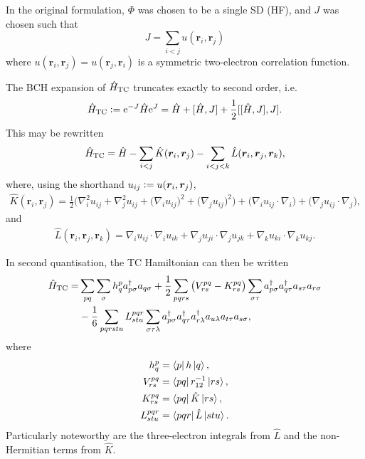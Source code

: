 In the original formulation, $\Phi$ was chosen to be a single \gls{SD} (\gls{HF}), and $J$ was chosen such that
\begin{equation}
    \label{eq:jastrow-two-elec}
    J = \sum_{i<j}u(\bm r_i, \bm r_j)
\end{equation}
where $u(\bm r_i, \bm r_j) = u(\bm r_j, \bm r_i)$ is a symmetric two-electron correlation function.

The \gls{BCH} expansion of $\hat H_\mathrm{TC}$ truncates exactly to second order, i.e.
\begin{equation}
    \hat H_\mathrm{TC} \mathrel{\mathop:}= \mathrm{e}^{-J}\hat H\mathrm{e}^J= \hat H + [\hat H, J] + \frac 12[[\hat H,J],J].
\end{equation}
This may be rewritten
\begin{equation}
    \hat H_\mathrm{TC} = \hat H - \sum_{i<j}\hat K(\bm r_i, \bm r_j) - \sum_{i<j<k}\hat L(\bm r_i, \bm r_j, \bm r_k),
\end{equation}
where, using the shorthand $u_{ij} \mathrel{\mathop:}= u(\bm r_i, \bm r_j)$,
\begin{equation}
\begin{split}
    \hat{K}(\bm{r}_i, \bm{r}_j) = \frac{1}{2} \Bigg(
        \nabla_i^2 u_{ij} + \nabla_j^2 u_{ij} +
        \big(\nabla_i u_{ij}\big)^2
        + \big(\nabla_j u_{ij}\big)^2\Bigg)
        + \big(\nabla_i u_{ij} \cdot \nabla_i\big)
        + \big(\nabla_j u_{ij} \cdot \nabla_j\big)
        ,
\end{split}
\end{equation}
and
\begin{equation}
\begin{split}
\hat{L}(\bm{r}_i, \bm{r}_j, \bm{r}_k) =
\nabla_i u_{ij} \cdot \nabla_i u_{ik} +
\nabla_j u_{ji} \cdot \nabla_j u_{jk} +
\nabla_k u_{ki} \cdot \nabla_k u_{kj}.
\end{split}
\end{equation}

In second quantisation, the TC Hamiltonian can then be written
\begin{equation}
\begin{split}
    \hat H_\mathrm{TC} = &\sum_{pq}\sum_\sigma h_q^p a_{p\sigma}^\dagger a_{q\sigma}
    + \frac{1}{2} \sum_{pqrs} \big(V_{rs}^{pq} - K_{rs}^{pq}\big) \sum_{\sigma\tau}
    a_{p\sigma}^\dagger a_{q\tau}^\dagger a_{s\tau} a_{r\sigma} \\
    &- \frac{1}{6} \sum_{pqrstu} L_{stu}^{pqr}\sum_{\sigma\tau\lambda}
    a_{p\sigma}^\dagger a_{q\tau}^\dagger a_{r\lambda}^\dagger a_{u\lambda} a_{t\tau} a_{s\sigma},
\end{split}
\end{equation}
where
\begin{equation}
\begin{split}
    h_q^p &= \bra{p}h\ket{q}, \\
    V_{rs}^{pq} &= \bra{p q } r_{12}^{-1} \ket{ r s}, \\
    K_{rs}^{pq} &= \bra{p q } \hat{K} \ket{ r s}, \\
    L_{stu}^{pqr} &= \bra{p q r } \hat{L} \ket{s t u}.
\end{split}
\end{equation}
Particularly noteworthy are the three-electron integrals from $\hat L$ and the non-Hermitian terms from $\hat K$.

